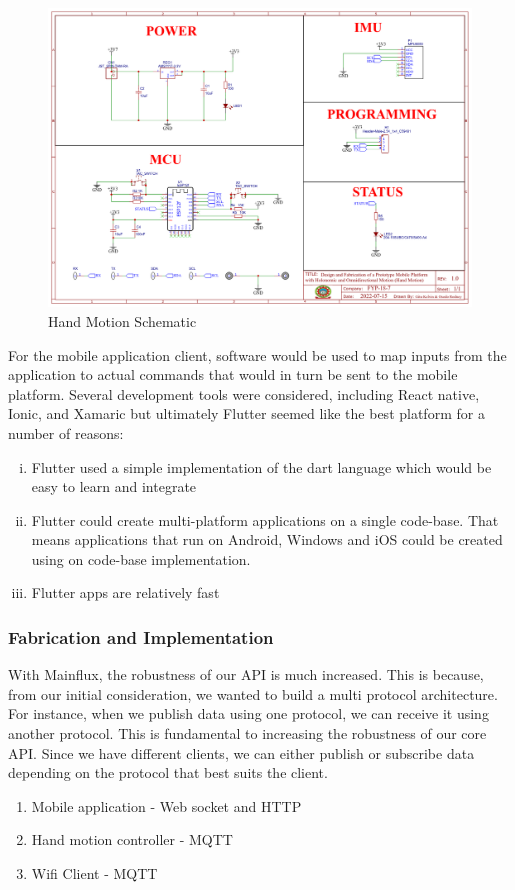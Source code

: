 \begin{figure}[H]
    \centering
    \includegraphics[scale=0.4]{Figures/HMSchematic.png}
    \caption{Hand Motion Schematic}
    \label{fig:handmotionschematic}
\end{figure}

For the mobile application client, software would be used to map inputs from the application to actual commands that would in turn be sent to the mobile platform. Several development tools were considered, including React native, Ionic, and Xamaric but ultimately Flutter seemed like the best platform for a number of reasons:
\begin{enumerate}[i.]
    \item Flutter used a simple implementation of the dart language which would be easy to learn and integrate
    \item Flutter could create multi-platform applications on a single code-base. That means applications that run on Android, Windows and iOS could be created using on code-base implementation.
    \item Flutter apps are relatively fast
\end{enumerate}

\subsubsection{Fabrication and Implementation}
With Mainflux, the robustness of our API is much increased. This is because, from our initial consideration, we wanted to build a multi protocol architecture. For instance, when we publish data using one protocol, we can receive it using another protocol. This is fundamental to increasing the robustness of our core API. Since we have different clients, we can either publish or subscribe data depending on the protocol that best suits the client.
\begin{enumerate}
    \item Mobile application - Web socket and \ac{HTTP}
    \item Hand motion controller - \ac{MQTT}
    \item Wifi Client - \ac{MQTT}    
\end{enumerate}

